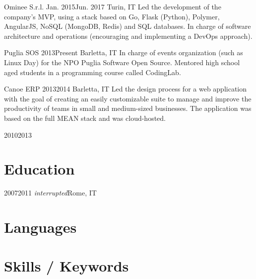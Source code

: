 \documentclass{resume}
\begin{document}
\begin{cvsection}
        {Ominee S.r.l.}%
        {Jan. 2015}{Jun. 2017}%
        {Turin, IT}%
        {Led the development of the company's MVP, using a stack based on Go,
            Flask (Python), Polymer, AngularJS, NoSQL (MongoDB, Redis) and SQL
            databases. In charge of software architecture and operations
            (encouraging and implementing a DevOps approach).}

        {Puglia SOS}%
        {2013}{Present}%
        {Barletta, IT}%
        {In charge of events organization (such as Linux Day) for the NPO Puglia
            Software Open Source. Mentored high school aged students in a
            programming course called CodingLab.}

        {Canoe ERP}%
        {2013}{2014}%
        {Barletta, IT}%
        {Led the design process for a web application with the goal of creating an
            easily customizable suite to manage and improve the productivity of
            teams in small and medium-sized businesses.  The application was based
            on the full MEAN stack and was cloud-hosted.}

        {}%
        {2010}{2013}%
        {}{}
\end{cvsection}

\section{Education}

\begin{cvsection}
        {2007}{2011 \lbrack \textit{interrupted}\rbrack}{Rome, IT}{}
\end{cvsection}

\section{Languages}

\begin{languagessection}
\end{languagessection}

\section{Skills / Keywords}
\end{document}
